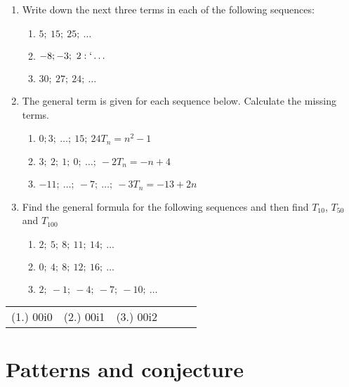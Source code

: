 \begin{exercises}{}
{ 
\begin{enumerate}[noitemsep, label=\textbf{\arabic*}. ] 
\item Write down the next three terms in each of the following sequences:

  \begin{enumerate} [noitemsep, label=\textbf{(\alph*)} ]
  \item $5;~15;~25;~\ldots$
  \item $-8;-3;~2:`\ldots$
  \item $30;~27;~24;~\ldots$
  \end{enumerate}
 \item The general term is given for each sequence below. Calculate the missing terms.
  \begin{enumerate} [noitemsep, label=\textbf{(\alph*)} ]
  \item $0;3;~\ldots;~15;~24$\hspace{2.2cm}$T_{n}={n}^{2}-1$
  \item $3;~2;~1;~0;~\ldots;~-2$\hspace{2cm}$T_{n}=-n+4$
  \item $-11;~\ldots;~-7;~\ldots;~-3$\hspace{1.5cm}$T_{n}=-13+2n$
  \end{enumerate}
     
\item Find the general formula for the following sequences and then find ${T}_{10}$, ${T}_{50}$ and ${T}_{100}$
  \begin{enumerate}[noitemsep, label=\textbf{(\alph*)} ]
  \item $2;~5;~8;~11;~14;~\ldots$
  \item $0;~4;~8;~12;~16;~\ldots$
  \item $2;~-1;~-4;~-7;~-10;~\ldots$
  \end{enumerate}
\end{enumerate}
\par \practiceinfo
\par \begin{tabular}[h]{cccccc}
(1.)	00i0	&
(2.)	00i1	&
(3.)	00i2	&
\end{tabular}
}%
\end{exercises}


\section{Patterns and conjecture}

